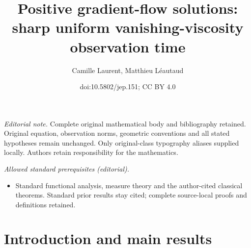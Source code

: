 \documentclass[10pt]{amsart}
\title{Positive gradient-flow solutions: sharp uniform vanishing-viscosity observation time}
\author{Camille Laurent, Matthieu Léautaud}
\date{doi:10.5802/jep.151; CC BY 4.0}
\theoremstyle{definition}
\providecommand{\mainmatter}{}\providecommand{\backmatter}{}
\begin{document}
\maketitle
\noindent\textit{Editorial note.} Complete original mathematical body and bibliography retained. Original equation, observation norms, geometric conventions and all stated hypotheses remain unchanged. Only original-class typography aliases supplied locally. Authors retain responsibility for the mathematics.\par\medskip
\noindent\textit{Allowed standard prerequisites (editorial).}\begin{itemize}
\item Standard functional analysis, measure theory and the author-cited classical theorems. Standard prior results stay cited; complete source-local proofs and definitions retained.
\end{itemize}\medskip
\vspace*{-\baselineskip}
\tableofcontents
\mainmatter

\section{Introduction and main results}
\end{document}
